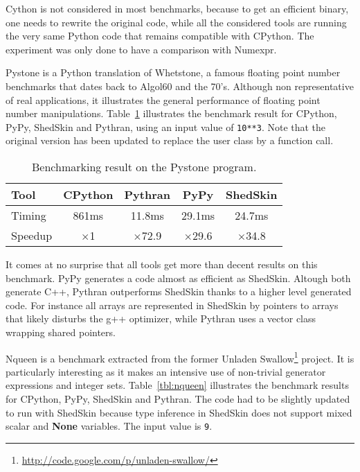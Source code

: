 \documentclass[10pt, onecolumn, preprint]{sigplanconf}
\begin{document}
Cython is not considered in most benchmarks, because to get an efficient
binary, one needs to rewrite the original code, while all the considered tools
are running the very same Python code that remains compatible with CPython. The
experiment was only done to have a comparison with Numexpr.

Pystone is a Python translation of Whetstone, a famous floating point number
benchmarks that dates back to Algol60 and the 70's. Although non representative
of real applications, it illustrates the general performance of floating point
number manipulations. Table~\ref{tbl:pystone}  illustrates the benchmark
result for CPython, PyPy, ShedSkin and Pythran, using an input value of
\texttt{10**3}. Note that the original version has been updated to replace the user
class by a function call.

\begin{table}
    \centering

    \begin{tabular}{|l|c|c|c|c|}
        \hline
     Tool    &  CPython    &   Pythran     &     PyPy   &  ShedSkin  \\
    \hline
     Timing  &  861ms      &   11.8ms      &     29.1ms &  24.7ms    \\
    \hline
     Speedup &  $\times$1         &   $\times$72.9       &    $\times$29.6   &  $\times$34.8     \\
    \hline
\end{tabular}

    \caption{Benchmarking result on the Pystone program.}
    \label{tbl:pystone}

\end{table}

It comes at no surprise that all tools get more than decent results on this
benchmark. PyPy generates a code almost as efficient as ShedSkin. Altough both
generate C++, Pythran outperforms ShedSkin thanks to a higher level generated
code. For instance all arrays are represented in ShedSkin by pointers to arrays
that likely disturbs the g++ optimizer, while Pythran uses a vector class wrapping
shared pointers.

Nqueen is a benchmark extracted from the former Unladen Swallow\footnote{\url{http://code.google.com/p/unladen-swallow/}} project. It
is particularly interesting as it makes an intensive use of non-trivial
generator expressions and integer sets. Table~\ref{tbl:nqueen} illustrates
the benchmark results for CPython, PyPy, ShedSkin and Pythran. The code had to
be slightly updated to run with ShedSkin because type inference in ShedSkin does
not support mixed scalar and \textbf{None} variables. The input value is \texttt{9}.
\end{document}
